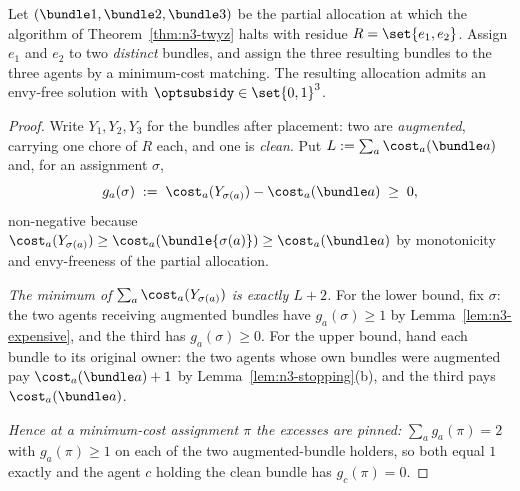 \begin{theorem}
\label{thm:n3-two}
Let $(\bundle1,\bundle2,\bundle3)$ be the partial allocation at which the
algorithm of Theorem~\ref{thm:n3-twyz} halts with residue
$R = \set{e_1,e_2}$. Assign $e_1$ and $e_2$ to two \emph{distinct} bundles, and
assign the three resulting bundles to the three agents by a minimum-cost
matching. The resulting allocation admits an envy-free solution with
$\optsubsidy \in \set{0,1}^3$.
\end{theorem}

\begin{proof}
Write $Y_1,Y_2,Y_3$ for the bundles after placement: two are \emph{augmented},
carrying one chore of $R$ each, and one is \emph{clean}. Put
$L := \sum_a \cost_a(\bundle a)$ and, for an assignment $\sigma$,
\[
  g_a(\sigma) \;:=\; \cost_a(Y_{\sigma(a)}) - \cost_a(\bundle a) \;\ge\; 0,
\]
non-negative because $\cost_a(Y_{\sigma(a)}) \ge \cost_a(\bundle{\sigma(a)})
\ge \cost_a(\bundle a)$ by monotonicity and envy-freeness of the partial
allocation.

\emph{The minimum of $\sum_a \cost_a(Y_{\sigma(a)})$ is exactly $L + 2$.} For
the lower bound, fix $\sigma$: the two agents receiving augmented bundles have
$g_a(\sigma) \ge 1$ by Lemma~\ref{lem:n3-expensive}, and the third has
$g_a(\sigma) \ge 0$. For the upper bound, hand each bundle to its original
owner: the two agents whose own bundles were augmented pay
$\cost_a(\bundle a) + 1$ by Lemma~\ref{lem:n3-stopping}(b), and the third pays
$\cost_a(\bundle a)$.

\emph{Hence at a minimum-cost assignment $\pi$ the excesses are pinned:}
$\sum_a g_a(\pi) = 2$ with $g_a(\pi) \ge 1$ on each of the two
augmented-bundle holders, so both equal $1$ exactly and the agent $c$ holding
the clean bundle has $g_c(\pi) = 0$.


\end{proof}
